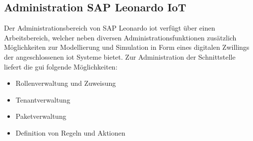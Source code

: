 \subsection{Administration SAP Leonardo IoT}
\label{ss:interface:admin}

\noindent Der Administrationsbereich von SAP Leonardo \ac{iot} verfügt über einen Arbeitsbereich, welcher neben diversen Administrationsfunktionen zusätzlich Möglichkeiten zur Modellierung und Simulation in Form eines digitalen Zwillings der angeschlossenen \ac{iot} Systeme bietet. Zur Administration der Schnittstelle liefert die \ac{gui} folgende Möglichkeiten:
\begin{itemize}
	\setlength{\itemsep}{1pt}
	\item{Rollenverwaltung und Zuweisung}
	\item{Tenantverwaltung}
	\item{Paketverwaltung}
	\item{Definition von Regeln und Aktionen}
\end{itemize}

